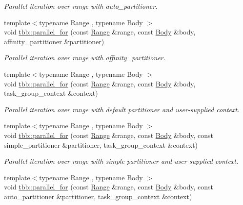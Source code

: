 \begin{DoxyCompactItemize}
\begin{DoxyCompactList}\small\item\em Parallel iteration over range with auto\+\_\+partitioner. \end{DoxyCompactList}\item 
{\footnotesize template$<$typename Range , typename Body $>$ }\\void \hyperlink{group__algorithms_gaf3d39e372d825bf54283b5ceafa90057}{tbb\+::parallel\+\_\+for} (const \hyperlink{classtbb_1_1blocked__range}{Range} \&range, const \hyperlink{classBody}{Body} \&body, affinity\+\_\+partitioner \&partitioner)
\begin{DoxyCompactList}\small\item\em Parallel iteration over range with affinity\+\_\+partitioner. \end{DoxyCompactList}\item 
{\footnotesize template$<$typename Range , typename Body $>$ }\\void \hyperlink{group__algorithms_ga93a621202db94665144de38c0b09bdad}{tbb\+::parallel\+\_\+for} (const \hyperlink{classtbb_1_1blocked__range}{Range} \&range, const \hyperlink{classBody}{Body} \&body, task\+\_\+group\+\_\+context \&context)
\begin{DoxyCompactList}\small\item\em Parallel iteration over range with default partitioner and user-\/supplied context. \end{DoxyCompactList}\item 
{\footnotesize template$<$typename Range , typename Body $>$ }\\void \hyperlink{group__algorithms_ga5b7fab9d6ffe7a9345e9349a5a007bd4}{tbb\+::parallel\+\_\+for} (const \hyperlink{classtbb_1_1blocked__range}{Range} \&range, const \hyperlink{classBody}{Body} \&body, const simple\+\_\+partitioner \&partitioner, task\+\_\+group\+\_\+context \&context)
\begin{DoxyCompactList}\small\item\em Parallel iteration over range with simple partitioner and user-\/supplied context. \end{DoxyCompactList}\item 
{\footnotesize template$<$typename Range , typename Body $>$ }\\void \hyperlink{group__algorithms_ga4c9935d8710a5cf786a92f3522ab2976}{tbb\+::parallel\+\_\+for} (const \hyperlink{classtbb_1_1blocked__range}{Range} \&range, const \hyperlink{classBody}{Body} \&body, const auto\+\_\+partitioner \&partitioner, task\+\_\+group\+\_\+context \&context)

\end{DoxyCompactItemize}
